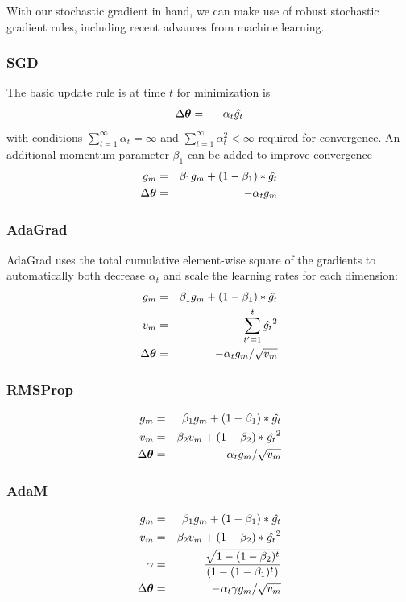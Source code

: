\documentclass[]{article}
\begin{document}
With our stochastic gradient in hand, we can make use of robust stochastic gradient rules, including recent advances from machine learning.  

\subsubsection{SGD}
The basic update rule is at time $t$ for minimization is
\begin{eqnarray}
  \Delta{\bm \theta} & = & - \alpha_t \hat{g_t}
\end{eqnarray} 
with conditions $\sum_{t=1}^{\infty} \alpha_t = \infty$ and $\sum_{t=1}^{\infty} \alpha_t^2 < \infty$ required for convergence.
An additional momentum parameter $\beta_1$ can be added to improve convergence
\begin{eqnarray}
  g_m & = & \beta_1 g_m + (1-\beta_1)*\hat{g_t} \\
  \Delta{\bm \theta} & = & - \alpha_t g_m
\end{eqnarray}

\subsubsection{AdaGrad}
AdaGrad uses the total cumulative element-wise square of the gradients to automatically both decrease $\alpha_t$ and scale the learning rates for each dimension: 
\begin{eqnarray}
  g_m    & = & \beta_1 g_m + (1-\beta_1)*\hat{g_t} \\
  v_m & = & \sum_{t'=1}^t \hat{g_t}^2 \\
  \Delta{\bm \theta} & = & - \alpha_t g_m / \sqrt{v_m}
\end{eqnarray}

\subsubsection{RMSProp}
\begin{eqnarray}
  g_m    & = & \beta_1 g_m + (1-\beta_1)*\hat{g_t} \\
  v_m & = & \beta_2 v_m + (1-\beta_2)*\hat{g_t}^2 \\
  \Delta{\bm \theta} & = & - \alpha_t g_m / \sqrt{v_m}
\end{eqnarray}

\subsubsection{AdaM}
\begin{eqnarray}
  g_m    & = & \beta_1 g_m + (1-\beta_1)*\hat{g_t} \\
  v_m & = & \beta_2 v_m + (1-\beta_2)*\hat{g_t}^2 \\
  \gamma & = & \frac{ \sqrt{1-(1-\beta_2)^t}}{(1-(1-\beta_1)^t)} \\
  \Delta{\bm \theta} & = & - \alpha_t \gamma g_m / \sqrt{v_m}
\end{eqnarray}
\end{document}
